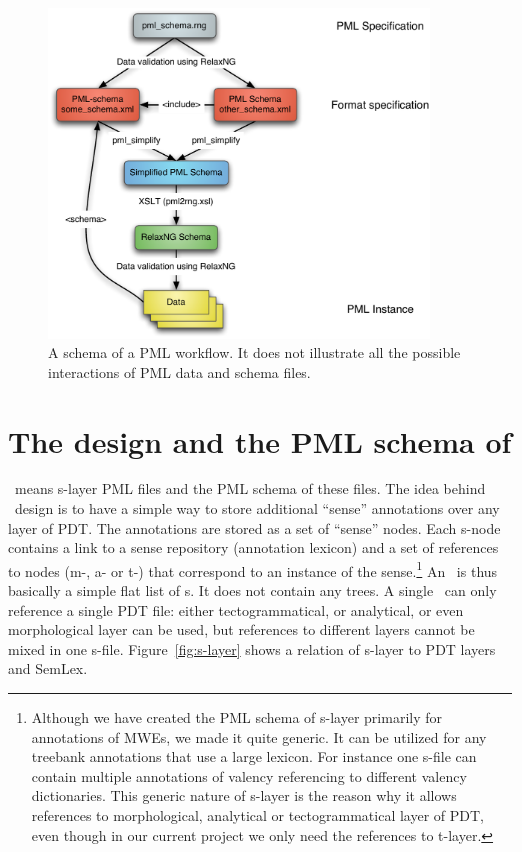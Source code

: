 \begin{figure}[htbp]
   \centering
   \includegraphics[width=0.9\textwidth]{images/pml-schema.pdf}
   \caption{A schema of a PML workflow. It does not illustrate all the possible interactions of PML data and schema files.}
   \label{fig:pml}
\end{figure}


\section{The design and the PML schema of \sdata}
\label{sec:s:design}
\sdata\ means s-layer PML files and the PML schema of these files. The idea behind \sdata\ design is to have a simple way to store additional ``sense'' annotations over any layer of PDT. The annotations are stored as a set of ``sense'' nodes. Each s-node contains a link to a sense repository (annotation lexicon) and a set of references to nodes (m-, a- or t-) that correspond to an instance of the sense.\footnote{Although we have created the PML schema of s-layer primarily for annotations of MWEs, we made it quite generic. It can be utilized for any treebank annotations that use a large lexicon. For instance one s-file can contain multiple annotations of valency referencing to different valency dictionaries. This generic nature of s-layer is the reason why it allows references to morphological, analytical or tectogrammatical layer of PDT, even though in our current project we only need the references to t-layer.} An \sf\ is thus basically a simple flat list of \sn{}s. It does not contain any trees. A single \sf\ can only reference a single PDT file: either tectogrammatical, or analytical, or even morphological layer can be used, but references to different layers cannot be mixed in one s-file. Figure~\ref{fig:s-layer} shows a relation of s-layer to PDT layers and SemLex.

